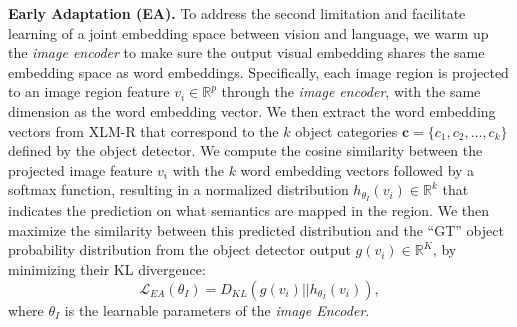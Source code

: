 \documentclass[final]{cvpr}
\newcommand{\jj}[1]{\textcolor{red}{\small{\bf [JJ: #1 ]}}}
\newcommand{\mingyang}[1]{\textcolor{brown}{\small{\bf [Mingyang: #1 ]}}}
\newcommand{\head}[1]{\noindent\textbf{#1}}
\begin{document}
\head{Early Adaptation (EA).} To address the second limitation and facilitate learning of a joint embedding space between vision and language, we warm up the \textit{image encoder} to make sure the output visual embedding shares the same embedding space as word embeddings.
Specifically, each image region is projected to an image region feature $v_{i} \in \mathbb{R}^{p}$ through the \textit{image encoder}, with the same dimension as the word embedding vector. We then extract the word embedding vectors from XLM-R that correspond to the $k$ object categories $\boldsymbol{c} = \{c_1, c_2, \dots, c_k\}$ defined by the object detector. We compute the cosine similarity between the projected image feature $v_{i}$ with the $k$ word embedding vectors followed by a softmax function, resulting in a normalized distribution $h_{\theta_{I}}(v_i) \in \mathbb{R}^{k}$ that indicates the prediction on what semantics are mapped in the region. We then maximize the similarity between this predicted distribution and the ``GT'' object probability distribution from the object detector output $g(v_i) \in \mathbb{R}^{K}$, by minimizing their  KL divergence:
\begin{equation*}
    \mathcal{L}_{EA}(\theta_{I}) = D_{KL}(g(v_i)||h_{\theta_{I}}(v_i)),
\end{equation*}
where $\theta_I$ is the learnable parameters of the \textit{image Encoder}. %
\end{document}

